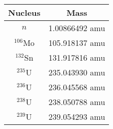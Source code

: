 \documentclass{report}
\begin{document}
\begin{table}[htbp]
	\centering
	\begin{tabular}{|c|c|}
			\hline
			Nucleus		&	\tab\- Mass \tab\- \\
			\hline	
			$n$			&  1.00866492 amu \\
			$^{106}$Mo	&  105.918137 amu \\
			$^{132}$Sn	&  131.917816 amu \\
			$^{235}$U	&  235.043930 amu \\
			$^{236}$U	&  236.045568 amu \\	
			$^{238}$U	&  238.050788 amu \\
			$^{239}$U	&  239.054293 amu \\
			\hline
	\end{tabular}
	\label{tab:design-specs}
\end{table}
\end{document}
